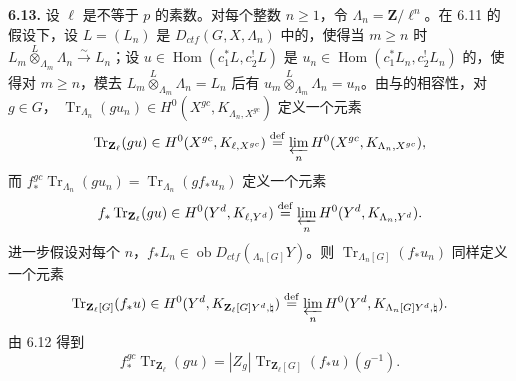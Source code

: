 \textbf{6.13.} 设 $\ell$ 是不等于 $p$ 的素数。对每个整数 $n\ge1$，令 $\Lambda_n=\mathbf Z/\ell^n$。在 6.11 的假设下，设 $L=(L_n)$ 是
$D_{ctf}(G,X,\Lambda_n)$ 中的，使得当 $m\ge n$ 时 $L_m\overset L\otimes_{\Lambda_m}\Lambda_n\xrightarrow\sim L_n$；设 $u\in\operatorname{Hom}(c_1^*L,c_2^!L)$ 是 $u_n\in\operatorname{Hom}(c_1^*L_n,c_2^!L_n)$ 的，使得对 $m\ge n$，模去 $L_m\overset L\otimes_{\Lambda_m}\Lambda_n=L_n$ 后有 $u_m\overset L\otimes_{\Lambda_m}\Lambda_n=u_n$。由与的相容性，对 $g\in G$， $\operatorname{Tr}_{\Lambda_n}(gu_n)\in H^0(X^{gc},K_{\Lambda_n,X^{gc}})$ 定义一个元素
\[\operatorname{Tr}_{\mathbf Z_\ell}(gu)\in H^0(X^{gc},K_{\ell,X^{gc}})\overset{\mathrm{def}}=\varprojlim_n H^0(X^{gc},K_{\Lambda_n,X^{gc}}),\]
而 $f_*^{gc}\operatorname{Tr}_{\Lambda_n}(gu_n)=\operatorname{Tr}_{\Lambda_n}(gf_*u_n)$ 定义一个元素
\[f_*\operatorname{Tr}_{\mathbf Z_\ell}(gu)\in H^0(Y^d,K_{\ell,Y^d})\overset{\mathrm{def}}=\varprojlim_n H^0(Y^d,K_{\Lambda_n,Y^d}).\]
进一步假设对每个 $n$，$f_*L_n\in\operatorname{ob}D_{ctf}({}_{\Lambda_n[G]}Y)$。则 $\operatorname{Tr}_{\Lambda_n[G]}(f_*u_n)$ 同样定义一个元素
\[\operatorname{Tr}_{\mathbf Z_\ell[G]}(f_*u)\in H^0(Y^d,K_{\mathbf Z_\ell[G]Y^d,\natural})\overset{\mathrm{def}}=\varprojlim_n H^0(Y^d,K_{\Lambda_n[G]Y^d,\natural}).\]
由 6.12 得到
\begin{equation}f_*^{gc}\operatorname{Tr}_{\mathbf Z_\ell}(gu)=|Z_g|\operatorname{Tr}_{\mathbf Z_\ell[G]}(f_*u)(g^{-1}).\tag{6.13.1}\end{equation}

